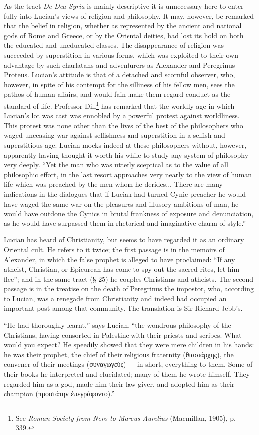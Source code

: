 \documentclass[a4paper, 11pt, oneside, polutonikogreek, english]{article}
\begin{document}
As the tract \emph{De Dea Syria} is mainly descriptive it is unnecessary here to enter fully into Lucian's views of religion and philosophy. It may, however, be remarked that the belief in religion, whether as represented by the ancient and national gods of Rome and Greece, or by the Oriental deities, had lost its hold on both the educated and uneducated classes. The disappearance of religion was succeeded by superstition in various forms, which was exploited to their own advantage by such charlatans and adventurers as Alexander and Peregrinus Proteus. Lucian's attitude is that of a detached and scornful observer, who, however, in spite of his contempt for the silliness of his fellow men, sees the pathos of human affairs, and would fain make them regard conduct as the standard of life. Professor Dill\footnote{See \emph{Roman Society from Nero to Marcus Aurelius} (Macmillan, 1905), p. 339.} has remarked that the worldly age in which Lucian's lot was cast was ennobled by a powerful protest against worldliness. This protest was none other than the lives of the best of the philosophers who waged unceasing war against selfishness and superstition in a selfish and superstitious age. Lucian mocks indeed at these philosophers without, however, apparently having thought it worth his while to study any system of philosophy very deeply. ``Yet the man who was utterly sceptical as to the value of all philosophic effort, in the last resort approaches very nearly to the view of human life which was preached by the men whom he derides... There are many indications in the dialogues that if Lucian had turned Cynic preacher he would have waged the same war on the pleasures and illusory ambitions of man, he would have outdone the Cynics in brutal frankness of exposure and denunciation, as he would have surpassed them in rhetorical and imaginative charm of style.''

Lucian has heard of Christianity, but seems to have regarded it as an ordinary Oriental cult. He refers to it twice; the first passage is in the memoirs of Alexander, in which the false prophet is alleged to have proclaimed: ``If any atheist, Christian, or Epicurean has come to spy out the sacred rites, let him flee''; and in the same tract (§ 25) he couples Christians and atheists. The second passage is in the treatise on the death of Peregrinus the impostor, who, according to Lucian, was a renegade from Christianity and indeed had occupied an important post among that community. The translation is Sir Richard Jebb's.

``He had thoroughly learnt,'' says Lucian, ``the wondrous philosophy of the Christians, having consorted in Palestine with their priests and scribes. What would you expect? He speedily showed that they were mere children in his hands: he was their prophet, the chief of their religious fraternity (θιασιάρχης), the convener of their meetings (συναγωγεύς) --- in short, everything to them. Some of their books he interpreted and elucidated; many of them he wrote himself. They regarded him as a god, made him their law-giver, and adopted him as their champion (προστάτην ἐπεγράφοντο).''
\end{document}
